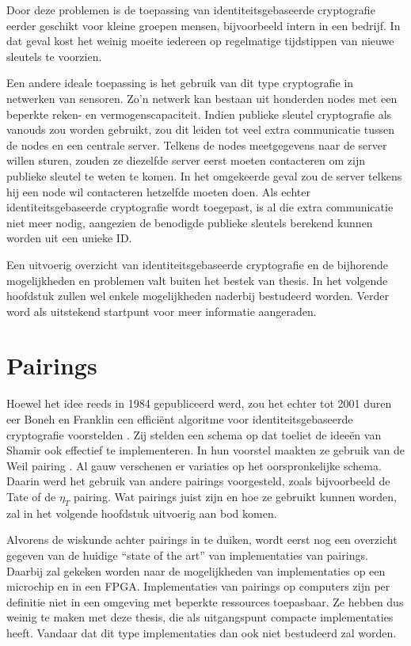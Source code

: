 Door deze problemen is de toepassing van identiteitsgebaseerde cryptografie eerder geschikt voor kleine groepen mensen, bijvoorbeeld intern in een bedrijf. In dat geval kost het weinig moeite iedereen op regelmatige tijdstippen van nieuwe sleutels te voorzien.

Een andere ideale toepassing is het gebruik van dit type cryptografie in netwerken van sensoren. Zo'n netwerk kan bestaan uit honderden nodes met een beperkte reken- en vermogenscapaciteit. Indien publieke sleutel cryptografie als vanouds zou worden gebruikt, zou dit leiden tot veel extra communicatie tussen de nodes en een centrale server. Telkens de nodes meetgegevens naar de server willen sturen, zouden ze diezelfde server eerst moeten contacteren om zijn publieke sleutel te weten te komen. In het omgekeerde geval zou de server telkens hij een node wil contacteren hetzelfde moeten doen.  Als echter identiteitsgebaseerde cryptografie wordt toegepast, is al die extra communicatie niet meer nodig, aangezien de benodigde publieke sleutels berekend kunnen worden uit een unieke ID.

Een uitvoerig overzicht van identiteitsgebaseerde cryptografie en de bijhorende mogelijkheden en problemen valt buiten het bestek van thesis. In het volgende hoofdstuk zullen wel enkele mogelijkheden naderbij bestudeerd worden. Verder word als uitstekend startpunt voor meer informatie \cite{maas} aangeraden.

\section{Pairings\label{inleiding-pairings}}

Hoewel het idee reeds in 1984 gepubliceerd werd, zou het echter tot 2001 duren eer Boneh en Franklin een effici\"ent algoritme voor identiteitsgebaseerde cryptografie voorstelden \cite{boneh}. Zij stelden een schema op dat toeliet de idee\"en van Shamir ook effectief te implementeren. In hun voorstel maakten ze gebruik van de Weil pairing \cite{weil}. Al gauw verschenen er variaties op het oorspronkelijke schema. Daarin werd het gebruik van andere pairings voorgesteld, zoals bijvoorbeeld de Tate \cite{tate} of de $\eta_T$ \cite{eta} pairing. Wat pairings juist zijn en hoe ze gebruikt kunnen worden, zal in het volgende hoofdstuk uitvoerig aan bod komen.

Alvorens de wiskunde achter pairings in te duiken, wordt eerst nog een overzicht gegeven van de huidige ``state of the art'' van implementaties van pairings. Daarbij zal gekeken worden naar de mogelijkheden van implementaties op een microchip en in een FPGA. Implementaties van pairings op computers zijn per definitie niet in een omgeving met beperkte ressources toepasbaar. Ze hebben dus weinig te maken met deze thesis, die als uitgangspunt compacte implementaties heeft. Vandaar dat dit type implementaties dan ook niet bestudeerd zal worden.

